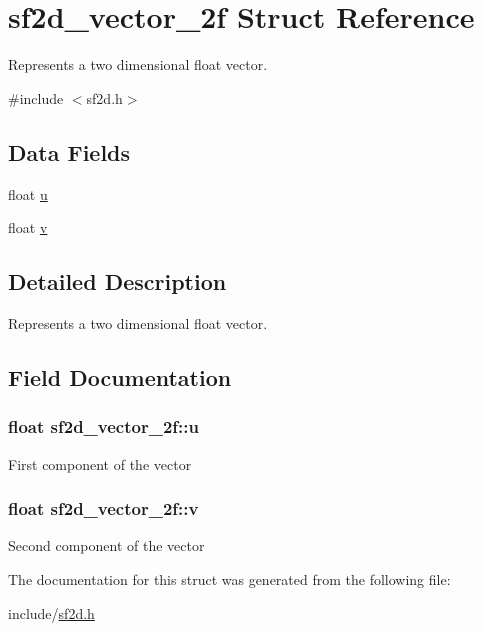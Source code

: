 \hypertarget{structsf2d__vector__2f}{\section{sf2d\-\_\-vector\-\_\-2f Struct Reference}
\label{structsf2d__vector__2f}
}


Represents a two dimensional float vector.  




{\ttfamily \#include $<$sf2d.\-h$>$}

\subsection*{Data Fields}
\begin{DoxyCompactItemize}
\item 
float \hyperlink{structsf2d__vector__2f_aabe555907fa0cee95076998b0a23aed9}{u}
\item 
float \hyperlink{structsf2d__vector__2f_ae9cab2d0f74baf57efbdbfdffa8492b9}{v}
\end{DoxyCompactItemize}


\subsection{Detailed Description}
Represents a two dimensional float vector. 

\subsection{Field Documentation}
\hypertarget{structsf2d__vector__2f_aabe555907fa0cee95076998b0a23aed9}{
\subsubsection[{u}]{\setlength{\rightskip}{0pt plus 5cm}float sf2d\-\_\-vector\-\_\-2f\-::u}}\label{structsf2d__vector__2f_aabe555907fa0cee95076998b0a23aed9}
First component of the vector \hypertarget{structsf2d__vector__2f_ae9cab2d0f74baf57efbdbfdffa8492b9}{
\subsubsection[{v}]{\setlength{\rightskip}{0pt plus 5cm}float sf2d\-\_\-vector\-\_\-2f\-::v}}\label{structsf2d__vector__2f_ae9cab2d0f74baf57efbdbfdffa8492b9}
Second component of the vector 

The documentation for this struct was generated from the following file\-:\begin{DoxyCompactItemize}
\item 
include/\hyperlink{sf2d_8h}{sf2d.\-h}\end{DoxyCompactItemize}
